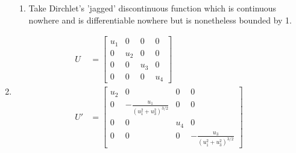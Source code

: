 \documentclass{article}
\begin{document}
\begin{enumerate}
\begin{enumerate}
\item
Take Dirchlet's 'jagged' discontinuous function which is continuous nowhere and is differentiable nowhere but is nonetheless bounded by 1.
\end{enumerate}
\item
\begin{equation*}
\begin{split}
U  &=
\begin{bmatrix}
u_{1}& 0& 0& 0 \\
0 & u_{2} & 0 & 0 \\
0 & 0 & u_{3} & 0 \\
0 & 0 & 0 & u_{4}
\end{bmatrix} \\
U' &= \begin{bmatrix}
u_{2} & 0 & 0 & 0 \\
0 & -\frac{u_{1}}{(u_{1}^{2}+u_{3}^{2})^{3/2}} & 0 & 0 \\
0 & 0 &  u_{4} & 0 \\
0 & 0 & 0 & -\frac{u_{3}}{(u_{1}^{2}+u_{3}^{2})^{3/2}}
\end{bmatrix}
\end{split}
\end{equation*}
\end{enumerate}
\end{document}
